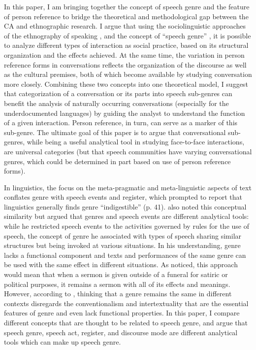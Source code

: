 \documentclass[12pt]{article}
\begin{document}
In this paper, I am bringing together the concept of speech genre and the  feature of person reference to bridge the theoretical and methodological gap between the CA and ethnographic research. I argue that using the sociolinguistic approaches of the ethnography of speaking \parencite{hymes1974}, and the concept of ``speech genre'' \parencite{bakhtin1986}, it is possible to analyze different types of interaction as social practice, based on its structural organization and the effects achieved. At the same time, the variation in person reference forms in conversations reflects the organization of the discourse as well as the cultural premises, both of which become available by studying conversation more closely. Combining these two concepts into one theoretical model, I suggest that categorization of a conversation or its parts into speech sub-genres can benefit the analysis of naturally occurring conversations (especially for the underdocumented languages) by guiding the analyst to understand the function of a given interaction. Person reference, in turn, can serve as a marker of this sub-genre. The ultimate goal of this paper is to argue that conversational sub-genres, while being a useful analytical tool in studying face-to-face interactions, are universal categories (but that speech communities have varying conversational genres, which could be determined in part based on use of person reference forms).

In linguistics, the focus on the meta-pragmatic and meta-linguistic aspects of text conflates genre with speech events and register, which prompted \textcite{swales1990} to report that linguistics generally finds genre ``indigestible'' (p. 41). \textcite{hymes1974} also noted this conceptual similarity but argued that genres and speech events are different analytical tools: while he restricted speech events to the activities governed by rules for the use of speech, the concept of genre he associated with types of speech sharing similar structures but being invoked at various situations. In his understanding, genre lacks a functional component and texts and performances of the same genre can be used with the same effect in different situations. As \textcite{swales1990} noticed, this approach would mean that when a sermon is given outside of a funeral for satiric or political purposes, it remains a sermon with all of its effects and meanings. However, according to \textcite{bakhtin1986}, thinking that a genre remains the same in different contexts disregards the conventionalism and intertextuality that are the essential features of genre and even lack functional properties. In this paper, I compare different concepts that are thought to be related to speech genre, and argue that speech genre, speech act, register, and discourse mode are different analytical tools which can make up speech genre.
\end{document}

